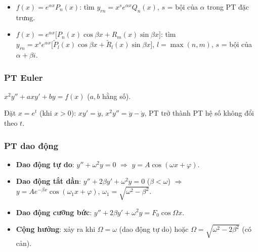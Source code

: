\documentclass[12pt,a4paper]{article}
\begin{document}
\begin{phuongphap}[title={Nghiệm riêng --- Phương pháp hệ số bất định}]
  \begin{itemize}
    \item $f(x) = e^{\alpha x} P_n(x)$: tìm $y_{rn} = x^s e^{\alpha x} Q_n(x)$, $s$ = bội của $\alpha$ trong PT đặc trưng.
    \item $f(x) = e^{\alpha x}\bigl[P_n(x)\cos\beta x + R_m(x)\sin\beta x\bigr]$:
      tìm $y_{rn} = x^s e^{\alpha x}\bigl[\tilde{P}_l(x)\cos\beta x + \tilde{R}_l(x)\sin\beta x\bigr]$, $l = \max(n,m)$, $s$ = bội của $\alpha + \beta i$.
  \end{itemize}
\end{phuongphap}

\subsubsection{PT Euler}

\begin{dinhnghia}
  $x^2 y'' + axy' + by = f(x)$ \quad ($a, b$ hằng số).
\end{dinhnghia}

\begin{phuongphap}
  Đặt $x = e^t$ (khi $x > 0$): $xy' = \dot{y}$, $x^2 y'' = \ddot{y} - \dot{y}$, PT trở thành PT hệ số không đổi theo $t$.
\end{phuongphap}

\subsubsection{PT dao động}

\begin{congthuc}
  \begin{itemize}
    \item \textbf{Dao động tự do}: $y'' + \omega^2 y = 0$ $\Rightarrow$ $y = A\cos(\omega x + \varphi)$.
    \item \textbf{Dao động tắt dần}: $y'' + 2\beta y' + \omega^2 y = 0$ ($\beta < \omega$) $\Rightarrow$ $y = Ae^{-\beta x}\cos(\omega_1 x + \varphi)$, $\omega_1 = \sqrt{\omega^2 - \beta^2}$.
    \item \textbf{Dao động cưỡng bức}: $y'' + 2\beta y' + \omega^2 y = F_0\cos\Omega x$.
    \item \textbf{Cộng hưởng}: xảy ra khi $\Omega = \omega$ (dao động tự do) hoặc $\Omega = \sqrt{\omega^2 - 2\beta^2}$ (có cản).
  \end{itemize}
\end{congthuc}
\end{document}
